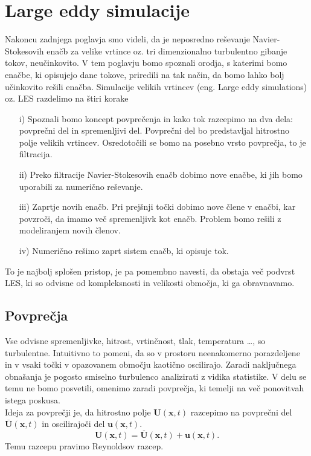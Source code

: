 \documentclass[mat2, tisk]{fmfdelo}
\newcommand{\bd}{\textbf}
\begin{document}
\newpage
\section{Large eddy simulacije}

Nakoncu zadnjega poglavja smo videli, da je neposredno reševanje Navier-Stokesovih enačb 
za velike vrtince oz. tri dimenzionalno turbulentno gibanje tokov, neučinkovito. V tem poglavju 
bomo spoznali orodja, s katerimi bomo enačbe, ki opisujejo dane tokove, priredili na tak
način, da bomo lahko bolj učinkovito rešili enačba. Simulacije velikih vrtincev (eng. 
Large eddy simulations) oz. LES razdelimo na štiri korake 
\begin{enumerate}
\item[i)] Spoznali bomo koncept povprečenja in kako tok razcepimo na dva dela: 
povprečni del in spremenljivi del. Povprečni del bo predstavljal hitrostno polje 
velikih vrtincev. Osredotočili se bomo na posebno vrsto povprečja, to je filtracija.
\item[ii)] Preko filtracije Navier-Stokesovih enačb dobimo nove enačbe, ki jih bomo 
uporabili za numerično reševanje. 
\item[iii)] Zaprtje novih enačb. Pri prejšnji točki dobimo nove člene v enačbi, kar 
povzroči, da imamo več spremenljivk kot enačb. Problem bomo rešili z modeliranjem 
novih členov.
\item[iv)] Numerično rešimo zaprt sistem enačb, ki opisuje tok.
\end{enumerate}

To je najbolj splošen pristop, je pa pomembno navesti, da obstaja več podvrst LES, 
ki so odvisne od kompleksnosti in velikosti območja, ki ga obravnavamo.

\subsection{Povprečja}

Vse odvisne spremenljivke, hitrost, vrtinčnost, tlak, temperatura \dots, so turbulentne.
Intuitivno to pomeni, da so v prostoru neenakomerno porazdeljene in v vsaki točki v 
opazovanem območju kaotično oscilirajo. Zaradi naključnega obnašanja je pogosto smiselno turbulenco 
analizirati z vidika statistike. V delu se temu ne bomo posvetili, omenimo zaradi 
povprečja, ki temelji na več ponovitvah istega poskusa. \\
Ideja za povprečji je, da hitrostno polje $\bd{U}(\bd{x}, t)$ razcepimo na povprečni del $\overline{\bd{U}}(\bd{x}, t)$ in 
oscilirajoči del $\bd{u}(\bd{x}, t)$.
\begin{equation}
\bd{U}(\bd{x}, t) = \overline{\bd{U}}(\bd{x},t) + \bd{u}(\bd{x}, t).
\end{equation}
Temu razcepu pravimo Reynoldsov razcep.
\end{document}
